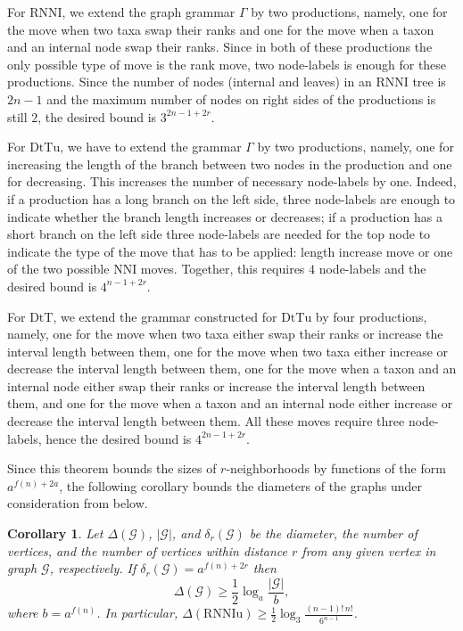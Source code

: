 \documentclass[11pt]{amsart}
\newtheorem{corollary}[lemma]{Corollary}
\theoremstyle{definition}
\newcommand{\nni}{\mathrm{NNI}}
\newcommand{\rnni}{\mathrm{RNNI}}
\newcommand{\rnniu}{\mathrm{RNNIu}}
\newcommand{\dtt}{\mathrm{DtT}}
\newcommand{\dttu}{\mathrm{DtTu}}
\newcommand{\G}{\mathcal{G}}
\begin{document}
For $\rnni$, we extend the graph grammar $\Gamma$ by two productions, namely, one for the move when two taxa swap their ranks and one for the move when a taxon and an internal node swap their ranks.
Since in both of these productions the only possible type of move is the rank move, two node-labels is enough for these productions.
Since the number of nodes (internal and leaves) in an $\rnni$ tree is $2n - 1$ and the maximum number of nodes on right sides of the productions is still $2$, the desired bound is $3^{2n-1 + 2r}$.

For $\dttu$, we have to extend the grammar $\Gamma$ by two productions, namely, one for increasing the length of the branch between two nodes in the production and one for decreasing.
This increases the number of necessary node-labels by one.
Indeed, if a production has a long branch on the left side, three node-labels are enough to indicate whether the branch length increases or decreases; if a production has a short branch on the left side three node-labels are needed for the top node to indicate the type of the move that has to be applied: length increase move or one of the two possible $\nni$ moves.
Together, this requires $4$ node-labels and the desired bound is $4^{n-1 + 2r}$.

For $\dtt$, we extend the grammar constructed for $\dttu$ by four productions, namely, one for the move when two taxa either swap their ranks or increase the interval length between them, one for the move when two taxa either increase or decrease the interval length between them, one for the move when a taxon and an internal node either swap their ranks or increase the interval length between them, and one for the move when a taxon and an internal node either increase or decrease the interval length between them.
All these moves require three node-labels, hence the desired bound is $4^{2n-1 + 2r}$.
\endproof

Since this theorem bounds the sizes of $r$-neighborhoods by functions of the form $a^{f(n) + 2a}$, the following corollary bounds the diameters of the graphs under consideration from below.

\begin{corollary}
Let $\Delta(\G)$, $|\G|$, and $\delta_r(\G)$ be the diameter, the number of vertices, and the number of vertices within distance $r$ from any given vertex in graph $\G$, respectively.
If $\delta_r(\G) = a^{f(n) + 2r}$ then
\[
\Delta(\G) \geq \frac 12 \log_a\frac{|\G|}{b},
\]
where $b = a^{f(n)}$.
In particular, $\Delta(\rnniu) \geq \frac 12 \log_3\frac{(n-1)!\,n!}{6^{n-1}}$.
\end{corollary}
\end{document}
